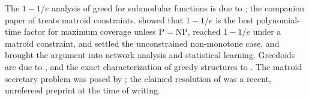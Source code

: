 \begin{refsection}
The $1-1/e$ analysis of greed for submodular functions is due to \textcite{NemhauserWolseyFisher1978}; the companion paper of \textcite{FisherNemhauserWolsey1978} treats matroid constraints. \textcite{Feige1998} showed that $1-1/e$ is the best polynomial-time factor for maximum coverage unless $\mathrm{P}=\mathrm{NP}$, \textcite{CalinescuChekuriPalVondrak2011} reached $1-1/e$ under a matroid constraint, and \textcite{BuchbinderFeldmanNaorSchwartz2015} settled the unconstrained non-monotone case. \textcite{KempeKleinbergTardos2003} and \textcite{DasKempe2011} brought the argument into network analysis and statistical learning. Greedoids are due to \textcite{KorteLovasz1981}, and the exact characterization of greedy structures to \textcite{HelmanMoretShapiro1993}. The matroid secretary problem was posed by \textcite{BabaioffImmorlicaKleinberg2007}; the claimed resolution of \textcite{Singla2026} was a recent, unrefereed preprint at the time of writing.


\printchapterbib
\end{refsection}
